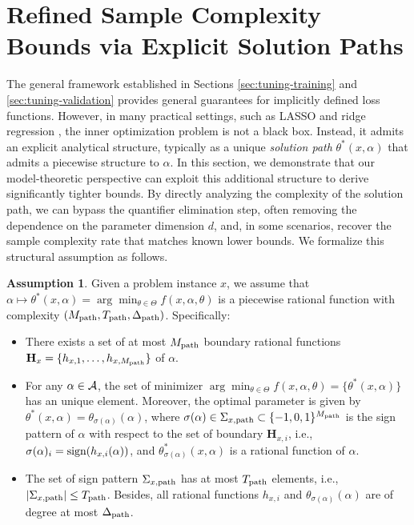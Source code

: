 \documentclass{article}
\theoremstyle{plain}
\theoremstyle{definition}
\newtheorem{assumption}[theorem]{Assumption}
\theoremstyle{remark}
\begin{document}
\section{Refined Sample Complexity Bounds via Explicit Solution Paths} \label{sec:refined-structure-improved-bound}

The general framework established in Sections \ref{sec:tuning-training} and \ref{sec:tuning-validation} provides general guarantees for implicitly defined loss functions. However, in many practical settings, such as LASSO and ridge regression \citep{tibshirani1996regression, hoerl1970ridge}, the inner optimization problem is not a black box. Instead, it admits an explicit analytical structure, typically as a unique \textit{solution path} $\theta^*(x, \alpha)$ that admits a piecewise structure to $\alpha$. In this section, we demonstrate that our model-theoretic perspective can exploit this additional structure to derive significantly tighter bounds. By directly analyzing the complexity of the solution path, we can bypass the quantifier elimination step, often removing the dependence on the parameter dimension $d$, and, in some scenarios, recover the sample complexity rate that matches known lower bounds. We formalize this structural assumption as follows.

\begin{assumption} \label{asmp:explicit-solution-path}
    Given a problem instance $x$, we assume that $\alpha \mapsto \theta^*(x, \alpha) = \arg\min_{{\theta \in \Theta}} f(x, \alpha, \theta)$ is a piecewise rational function with complexity $(M_\textup{path}, T_\textup{path}, \Delta_\textup{path})$. Specifically:
    \begin{itemize}[leftmargin=*]
        \item There exists a set of at most $M_\textup{path}$ boundary rational functions $\mathbf{H}_{x} = \{h_{x, 1}, \dots, h_{x, M_\textup{path}}\}$ of $\alpha$.

        \item For any $\alpha \in \mathcal{A}$, the set of minimizer $\arg \min_{\theta \in \Theta} f(x, \alpha, \theta) = \{\theta^*(x, \alpha)\}$ has an unique element. Moreover, the optimal parameter is given by $\theta^*(x, \alpha) = \theta_{\sigma(\alpha)}(\alpha)$, where $\sigma(\alpha) \in \Sigma_{{x}, \textup{path}} \subset \{-1, 0, 1\}^{M_\textup{path}}$ is the sign pattern of $\alpha$ with respect to the set of boundary $\mathbf{H}_{{x}, i}$, i.e., $\sigma(\alpha)_i = {\text{sign}}(h_{{x}, i}(\alpha))$, and $\theta^*_{\sigma(\alpha)}(x, \alpha)$ is a rational function of $\alpha$. 

        \item The set of sign pattern $\Sigma_{x, \textup{path}}$ has at most $T_\textup{path}$ elements, i.e., $\left| \Sigma_{x, \textup{path}} \right| \leq T_\textup{path}$. Besides, all rational functions $h_{{x}, i}$ and $\theta_{\sigma(\alpha)}(\alpha)$ are of degree at most $\Delta_\textup{path}$. 
    \end{itemize}
\end{assumption}
\end{document}
